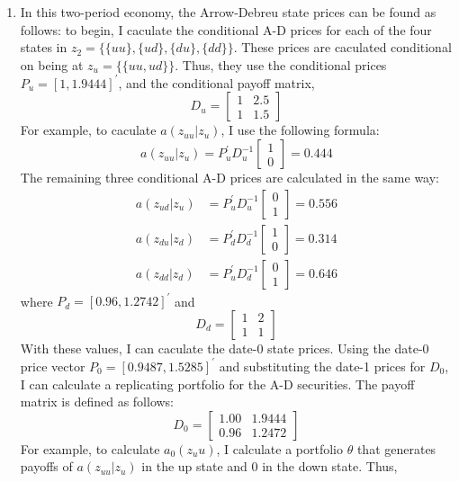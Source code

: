 \documentclass[11pt]{article}
\newcommand{\inv}[1]{#1^{-1}}
\begin{document}
\begin{enumerate}
	\item In this two-period economy, the Arrow-Debreu state prices can be found as follows: to begin, I caculate the conditional A-D prices for each of the four states in \(z_2 = \{ \{uu\}, \{ud\}, \{du\}, \{dd\} \}\). These prices are caculated conditional on being at \(z_{u} = \{\{uu, ud\}\}\). Thus, they use the conditional prices \(P_u = [1, 1.9444]^\prime\), and the conditional payoff matrix,
	\[D_u = \begin{bmatrix}
		1 & 2.5 \\ 1 & 1.5
	\end{bmatrix}\]
	For example, to caculate \(a(z_{uu} | z_u)\), I use the following formula:
	\[a(z_{uu} | z_u) = P_u^\prime \inv{D_u} \begin{bmatrix}
		1 \\ 0
	\end{bmatrix} = 0.444\]
	The remaining three conditional A-D prices are calculated in the same way:
	\begin{align*}
		a(z_{ud} | z_u) &= P_u^\prime \inv{D_u} \begin{bmatrix} 0 \\ 1 \end{bmatrix} = 0.556 \\
		a(z_{du} | z_d) &= P_d^\prime \inv{D_d} \begin{bmatrix} 1 \\ 0 \end{bmatrix} = 0.314 \\
		a(z_{dd} | z_d) &= P_u^\prime \inv{D_d} \begin{bmatrix} 0 \\ 1 \end{bmatrix} = 0.646
	\end{align*}
	where \(P_d = [0.96, 1.2742]^\prime\) and 
	\[D_d = \begin{bmatrix}
		1 & 2 \\ 1 & 1
	\end{bmatrix}\]
	With these values, I can caculate the date-0 state prices. Using the date-0 price vector \(P_0 = [0.9487, 1.5285 ]^\prime\) and substituting the date-1 prices for \(D_0\), I can calculate a replicating portfolio for the A-D securities. The payoff matrix is defined as follows:
	\[D_0 = \begin{bmatrix}
		1.00 & 1.9444 \\ 0.96 & 1.2472
	\end{bmatrix}\]
	For example, to calculate \(a_0(z_uu)\), I calculate a portfolio \(\theta\) that generates payoffs of \(a(z_{uu} | z_u)\) in the up state and 0 in the down state. Thus, 

\end{enumerate}
\end{document}

